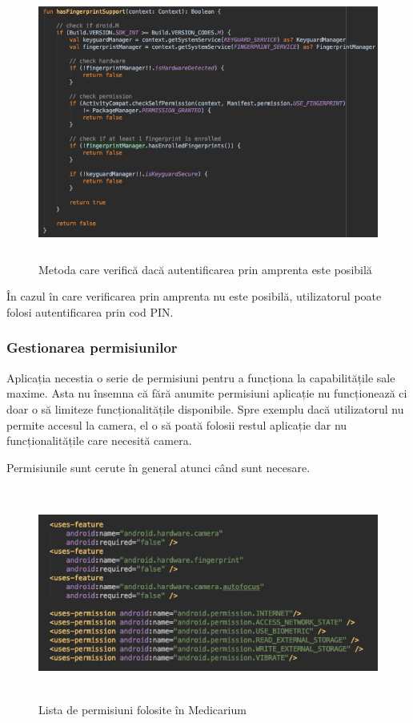 \documentclass[12pt]{article}
\begin{document}
\begin{figure}[H]
\centering
\includegraphics[width=14cm, height=9cm]{fingver.png}
\caption{Metoda care verifică dacă autentificarea prin amprenta este posibilă}
\end{figure}

În cazul în care verificarea prin amprenta nu este posibilă, utilizatorul poate folosi
autentificarea prin cod PIN.

\newpage
\subsubsection{Gestionarea permisiunilor}

Aplicația necestia o serie de permisiuni pentru a funcționa la capabilitățile sale
maxime. Asta nu însemna că fără anumite permisiuni aplicație nu funcționează ci doar o
să limiteze funcționalitățile disponibile. Spre exemplu dacă utilizatorul nu permite
accesul la camera, el o să poată folosii restul aplicație dar nu funcționalitățile care necesită 
camera.

Permisiunile sunt cerute în general atunci când sunt necesare.

\begin{figure}[H]
    \centering
    \includegraphics[width=14cm, height=7cm]{listapermi.png}
    \caption{Lista de permisiuni folosite în Medicarium}
    \end{figure}
\end{document}
